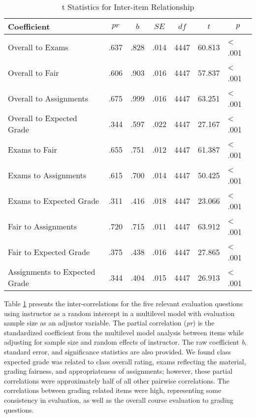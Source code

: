 \documentclass[man]{apa6}
\theoremstyle{definition}
\theoremstyle{definition}
\theoremstyle{definition}
\theoremstyle{remark}
\begin{document}
\begin{table}[tbp]
\begin{center}
\begin{threeparttable}
\caption{\label{tab:correlation-table}t Statistics for Inter-item Relationship}
\begin{tabular}{lcccccl}
\toprule
Coefficient & \multicolumn{1}{c}{$pr$} & \multicolumn{1}{c}{$b$} & \multicolumn{1}{c}{$SE$} & \multicolumn{1}{c}{$df$} & \multicolumn{1}{c}{$t$} & \multicolumn{1}{c}{$p$}\\
\midrule
Overall to Exams & .637 & .828 & .014 & 4447 & 60.813 & < .001\\
Overall to Fair & .606 & .903 & .016 & 4447 & 57.837 & < .001\\
Overall to Assignments & .675 & .999 & .016 & 4447 & 63.251 & < .001\\
Overall to Expected Grade & .344 & .597 & .022 & 4447 & 27.167 & < .001\\
Exams to Fair & .655 & .751 & .012 & 4447 & 61.387 & < .001\\
Exams to Assignments & .615 & .700 & .014 & 4447 & 50.425 & < .001\\
Exams to Expected Grade & .311 & .416 & .018 & 4447 & 23.066 & < .001\\
Fair to Assignments & .720 & .715 & .011 & 4447 & 63.912 & < .001\\
Fair to Expected Grade & .375 & .438 & .016 & 4447 & 27.865 & < .001\\
Assignments to Expected Grade & .344 & .404 & .015 & 4447 & 26.913 & < .001\\
\bottomrule
\end{tabular}
\end{threeparttable}
\end{center}
\end{table}

Table \ref{tab:correlation-table} presents the inter-correlations for
the five relevant evaluation questions using instructor as a random
intercept in a multilevel model with evaluation sample size as an
adjustor variable. The partial correlation (\emph{pr}) is the
standardized coefficient from the multilevel model analysis between
items while adjusting for sample size and random effects of instructor.
The raw coefficient \emph{b}, standard error, and significance
statistics are also provided. We found class expected grade was related
to class overall rating, exams reflecting the material, grading
fairness, and appropriateness of assignments; however, these partial
correlations were approximately half of all other pairwise correlations.
The correlations between grading related items were high, representing
some consistency in evaluation, as well as the overall course evaluation
to grading questions.
\end{document}
